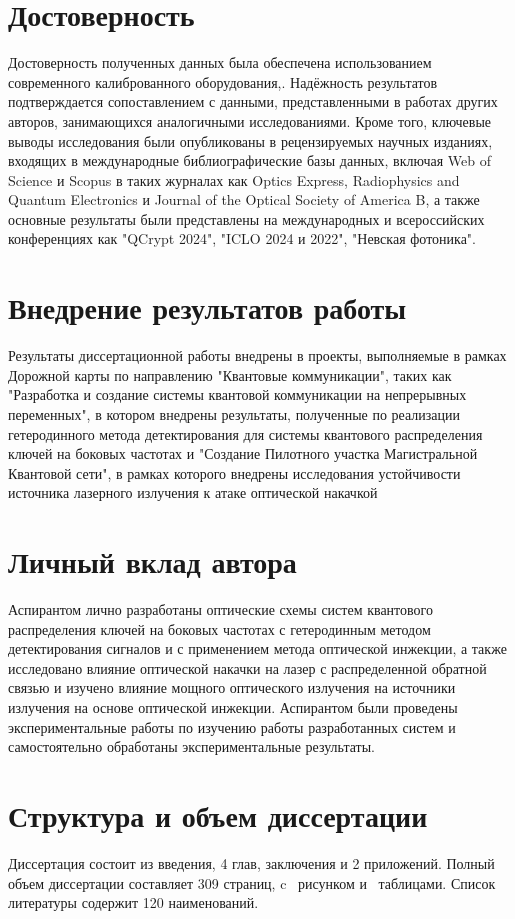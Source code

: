 \section*{Достоверность}
Достоверность полученных данных была обеспечена использованием современного калиброванного оборудования,. Надёжность результатов подтверждается сопоставлением с данными, представленными в работах других авторов, занимающихся аналогичными исследованиями. 
Кроме того, ключевые выводы исследования были опубликованы в рецензируемых научных изданиях, входящих в международные библиографические базы данных, включая Web of Science и Scopus в таких журналах как Optics Express, Radiophysics and Quantum Electronics и Journal of the Optical Society of America B, а также основные результаты были представлены на международных и всероссийских конференциях как "QCrypt 2024", "ICLO 2024 и 2022", "Невская фотоника".
\section*{Внедрение результатов работы}
Результаты диссертационной работы внедрены в проекты, выполняемые в рамках Дорожной карты по направлению "Квантовые коммуникации", таких как  "Разработка и создание системы квантовой коммуникации на непрерывных переменных", в котором внедрены результаты, полученные по реализации гетеродинного метода детектирования для системы квантового распределения ключей на боковых частотах  и "Создание Пилотного участка Магистральной Квантовой сети", в рамках которого внедрены исследования устойчивости источника лазерного излучения к атаке оптической накачкой


\section*{Личный вклад автора}
Аспирантом лично разработаны оптические схемы систем квантового распределения ключей на боковых частотах с гетеродинным методом детектирования сигналов и с применением метода оптической инжекции, а также исследовано влияние оптической накачки на лазер с распределенной обратной связью и изучено влияние мощного оптического излучения на источники излучения на основе оптической инжекции. Аспирантом были проведены экспериментальные работы по изучению работы разработанных систем и самостоятельно обработаны экспериментальные результаты.
\section*{Структура и объем диссертации} Диссертация состоит из введения, 4 глав, заключения и 2 приложений. Полный объем диссертации составляет  309 страниц, c  \totalfigures\ рисунком  и \totaltables\ таблицами. Список литературы содержит 120 наименований.


